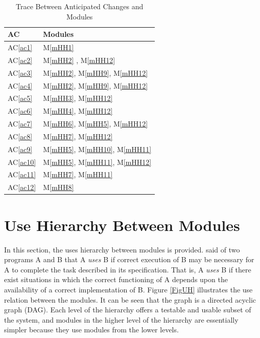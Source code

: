 \documentclass[12pt, titlepage]{article}
\newcommand{\acref}[1]{AC\ref{#1}}
\newcommand{\mref}[1]{M\ref{#1}}
\begin{document}
\begin{table}[H]
  \centering
  \begin{tabular}{p{} p{}}
  \toprule
  \textbf{AC} & \textbf{Modules}\\
  \midrule
  \acref{ac1} & \mref{mHH1}\\
  \acref{ac2} & \mref{mHH2} , \mref{mHH12}\\
  \acref{ac3} & \mref{mHH2}, \mref{mHH9}, \mref{mHH12}\\
  \acref{ac4} & \mref{mHH2}, \mref{mHH9}, \mref{mHH12}\\
  \acref{ac5} & \mref{mHH3}, \mref{mHH12}\\
  \acref{ac6} & \mref{mHH4}, \mref{mHH12}\\
  \acref{ac7} & \mref{mHH6}, \mref{mHH5}, \mref{mHH12}\\
  \acref{ac8} & \mref{mHH7}, \mref{mHH12}\\
  \acref{ac9} & \mref{mHH5}, \mref{mHH10}, \mref{mHH11}\\
  \acref{ac10} & \mref{mHH5}, \mref{mHH11}, \mref{mHH12}\\
  \acref{ac11} & \mref{mHH7}, \mref{mHH11}\\
  \acref{ac12} & \mref{mHH8}\\
  \bottomrule
  \end{tabular}
  \caption{Trace Between Anticipated Changes and Modules}
  \label{TblACT}
  \end{table}
  

\section{Use Hierarchy Between Modules} \label{SecUse}

In this section, the uses hierarchy between modules is
provided. \citet{Parnas1978} said of two programs A and B that A {\em uses} B if
correct execution of B may be necessary for A to complete the task described in
its specification. That is, A {\em uses} B if there exist situations in which
the correct functioning of A depends upon the availability of a correct
implementation of B.  Figure \ref{FigUH} illustrates the use relation between
the modules. It can be seen that the graph is a directed acyclic graph
(DAG). Each level of the hierarchy offers a testable and usable subset of the
system, and modules in the higher level of the hierarchy are essentially simpler
because they use modules from the lower levels.
\end{document}
